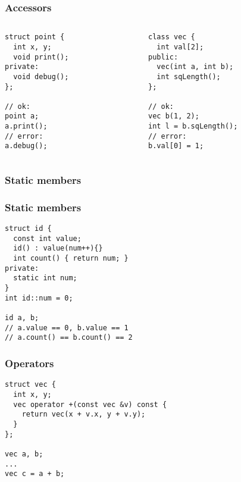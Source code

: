 \begin{frame}[fragile]
\frametitle{Accessors}
\lstset{
  xrightmargin=0cm
}
\begin{columns}[c]
  \begin{column}{0.5\textwidth}
\begin{lstlisting}
struct point {
  int x, y;
  void print();
private:
  void debug();
};

// ok:
point a;
a.print();
// error:
a.debug();
\end{lstlisting}
  \end{column}
  \begin{column}{0.5\textwidth}
\lstset{ numbers=none, xleftmargin=0cm }
\begin{lstlisting}
class vec {
  int val[2];
public:
  vec(int a, int b);
  int sqLength();
};

// ok:
vec b(1, 2);
int l = b.sqLength();
// error:
b.val[0] = 1;
\end{lstlisting}
  \end{column}
\end{columns}
\end{frame}

\begin{frame}[fragile]
\frametitle{Static members}
\end{frame}

\begin{frame}[fragile]
\frametitle{Static members}
\begin{lstlisting}
struct id {
  const int value;
  id() : value(num++){}
  int count() { return num; }
private:
  static int num;
}
int id::num = 0;

id a, b;
// a.value == 0, b.value == 1
// a.count() == b.count() == 2
\end{lstlisting}
\end{frame}

\begin{frame}[fragile]
\frametitle{Operators}
\begin{lstlisting}
struct vec {
  int x, y;
  vec operator +(const vec &v) const {
    return vec(x + v.x, y + v.y);
  }
};

vec a, b;
...
vec c = a + b;
\end{lstlisting}
\end{frame}